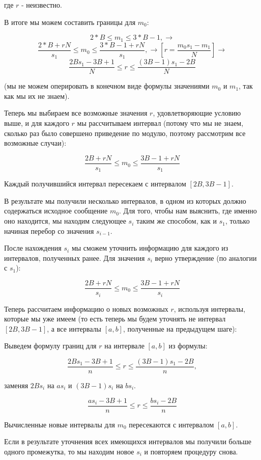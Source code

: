 \documentclass[12pt,a4paper]{scrartcl}
\begin{document}
где $r$ - неизвестно.

В итоге мы можем составить границы для $m_0$:


$$2*B \leq m_1 \leq 3*B-1, \rightarrow$$
$$\dfrac{2*B+rN}{s_1} \leq m_0 \leq \dfrac{3*B-1+rN}{s_1}, \rightarrow [r=\dfrac{m_0s_1-m_1}{N}] \rightarrow$$
$$\dfrac{2Bs_1-3B+1}{N} \leq r \leq \dfrac{(3B-1)s_1-2B}{N}$$

(мы не можем оперировать в конечном виде формулы значениями $m_0$ и $m_1$, так как мы их не знаем).

Теперь мы выбираем все возможные значения $r$, удовлетворяющие условию выше, и для каждого $r$ мы рассчитываем интервал (потому что мы не знаем, сколько раз было совершено приведение по модулю, поэтому рассмотрим все возможные случаи):

$$\dfrac{2B+rN}{s_1} \leq m_0 \leq \dfrac{3B-1+rN}{s_1}$$

Каждый получившийся интервал пересекаем с интервалом $[2B,3B-1]$.

В результате мы получили несколько интервалов, в одном из которых должно содержаться исходное сообщение $m_0$. Для того, чтобы нам выяснить, где именно оно находится, мы находим следующее $s_i$ таким же способом, как и $s_1$, только начиная перебор со значения $s_{i-1}$.

После нахождения $s_i$ мы сможем уточнить информацию для каждого из интервалов, полученных ранее. Для значения $s_i$ верно утверждение (по аналогии с $s_1$):

$$\dfrac{2B+rN}{s_i} \leq m_0 \leq \dfrac{3B-1+rN}{s_i}$$

Теперь рассчитаем информацию о новых возможных $r$, используя интервалы, которые мы уже имеем (то есть теперь мы будем уточнять не интервал $[2B,3B-1]$, а все интервалы $[a, b]$, полученные на предыдущем шаге):

Выведем формулу границ для $r$ на интервале $[a, b]$ из формулы:

$$\dfrac{2Bs_1 - 3B + 1}{n} \leq r \leq \dfrac{(3B-1)s_1 - 2B}{n},$$

заменяя $2Bs_i$ на $as_i$ и $(3B-1)s_i$ на $bs_i$.

$$\dfrac{as_i - 3B + 1}{n} \leq r \leq \dfrac{bs_i - 2B}{n}$$

Вычисленные новые интервалы для $m_0$ пересекаются с интервалом $[a, b]$.

Если в результате уточнения всех имеющихся интервалов мы получили больше одного промежутка, то мы находим новое $s_i$ и повторяем процедуру снова. 
\end{document}
